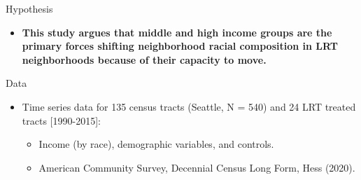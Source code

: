 \documentclass[11pt,ignorenonframetext,]{beamer}
\providecommand{\tightlist}{%
  \setlength{\itemsep}{0pt}\setlength{\parskip}{0pt}}
\begin{document}
\begin{frame}{Hypothesis}
\protect\hypertarget{hypothesis}{}

\begin{itemize}
\tightlist
\item
  \textbf{This study argues that middle and high income groups are the
  primary forces shifting neighborhood racial composition in LRT
  neighborhoods because of their capacity to move.}
\end{itemize}

\end{frame}

\begin{frame}{Data}
\protect\hypertarget{data}{}

\begin{itemize}
\tightlist
\item
  Time series data for 135 census tracts (Seattle, N = 540) and 24 LRT
  treated tracts {[}1990-2015{]}:

  \begin{itemize}
  \tightlist
  \item
    Income (by race), demographic variables, and controls.
  \item
    American Community Survey, Decennial Census Long Form, Hess (2020).
  \end{itemize}
\end{itemize}

\end{frame}
\end{document}
